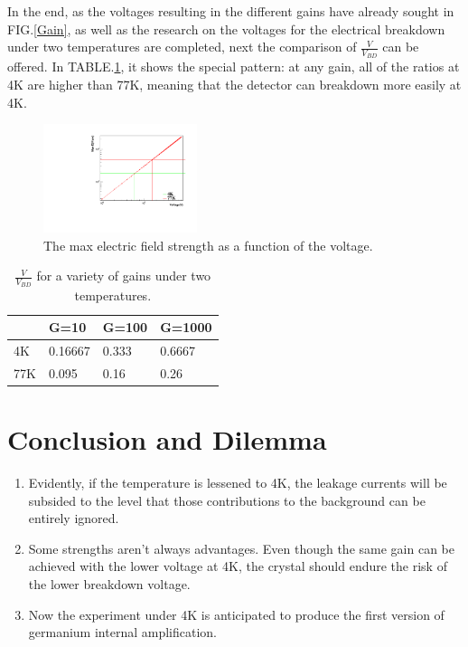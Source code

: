 \documentclass[%
 reprint,
 amsmath,amssymb,
 aps,
]{revtex4-2}
\begin{document}
In the end, as the voltages resulting in the different gains have already sought in FIG.\ref{Gain}, as well as the research on the voltages for the electrical breakdown under two temperatures are completed, next the comparison of $\frac{V}{V_{BD}}$ can be offered. In TABLE.\ref{Breakdown}, it shows the special pattern: at any gain, all of the ratios at 4K are higher than 77K, meaning that the detector can breakdown more easily at 4K.\\

\begin{figure}[h]
  \centering
  \includegraphics[width=0.4\textwidth]{Ex_PPC_Max.pdf}
  \caption{The max electric field strength as a function of the voltage.}
  \label{Ex_PPC_Max}
\end{figure}

\begin{center}
\begin{table}
 \begin{tabular}{||p{25mm}| p{22mm}| p{22mm}| p{22mm}||} 
 \hline
  & G=10& G=100 &G=1000 \\ 
 \hline\hline
 4K& 0.16667 & 0.333 & 0.6667 \\ [0.5ex] 
 \hline
 77K & 0.095& 0.16& 0.26 \\
  \hline
\end{tabular}
  \caption{$\frac{V}{V_{BD}}$ for a variety of gains under two temperatures.}
  \label{Breakdown}
  \end{table}
\end{center}


\section{Conclusion and Dilemma}

\begin{enumerate}
	\item Evidently, if the temperature is lessened to 4K, the leakage currents will be subsided to the level that those contributions to the background can be entirely ignored.
	\item Some strengths aren't always advantages. Even though the same gain can be achieved with the lower voltage at 4K, the crystal should endure the risk of the lower breakdown voltage.
	\item Now the experiment under 4K is anticipated to produce the first version of germanium internal amplification.
\end{enumerate}
\end{document}

